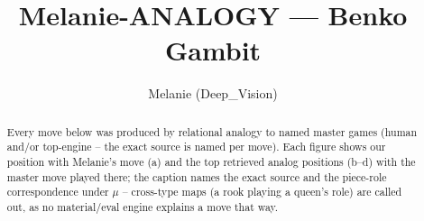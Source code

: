 \documentclass[11pt]{article}
\title{Melanie-ANALOGY — Benko Gambit}
\author{Melanie (Deep\_Vision)}
\date{}
\begin{document}
\maketitle

\begin{abstract}Every move below was produced by relational analogy to named master games (human and/or top-engine -- the exact source is named per move). Each figure shows our position with Melanie's move (a) and the top retrieved analog positions (b--d) with the master move played there; the caption names the exact source and the piece-role correspondence under $\mu$ -- cross-type maps (a rook playing a queen's role) are called out, as no material/eval engine explains a move that way.\end{abstract}

\begin{figure}[p]\centering
\begin{subfigure}{0.46\textwidth}\centering
\resizebox{\linewidth}{!}{%
\newchessgame
\chessboard[
  setfen={rn1qkb1r/3ppp1p/b4np1/2pP4/7P/2N5/PP2PPP1/R1BQKBNR b KQkq - 0 7},
  showmover=false,
  pgfstyle=straightmove, color=movearrow, markmove={f6-g8}
]}
\caption{}
\end{subfigure}\hfill
\begin{subfigure}{0.46\textwidth}\centering
\resizebox{\linewidth}{!}{%
\newchessgame
\chessboard[
  setfen={rnbqkb1r/3ppp1p/P4np1/2pP4/8/2N5/PP2PPPP/R1BQKBNR b KQkq - 1 6},
  showmover=false,
  pgfstyle=straightmove, color=movearrow, markmove={c8-a6}
]}
\caption{}
\end{subfigure}
\\[4pt]
\begin{subfigure}{0.46\textwidth}\centering
\resizebox{\linewidth}{!}{%
\newchessgame
\chessboard[
  setfen={rnbqkb1r/3ppp1p/P4np1/2pP4/8/2N5/PP2PPPP/R1BQKBNR b KQkq - 1 6},
  showmover=false,
  pgfstyle=straightmove, color=movearrow, markmove={c8-a6}
]}
\caption{}
\end{subfigure}\hfill
\begin{subfigure}{0.46\textwidth}\centering
\resizebox{\linewidth}{!}{%
\newchessgame
\chessboard[
  setfen={rnbqkb1r/3ppp1p/P4np1/2pP4/8/2N5/PP2PPPP/R1BQKBNR b KQkq - 1 6},
  showmover=false,
  pgfstyle=straightmove, color=movearrow, markmove={c8-a6}
]}
\caption{}
\end{subfigure}

\end{figure}
\end{document}
